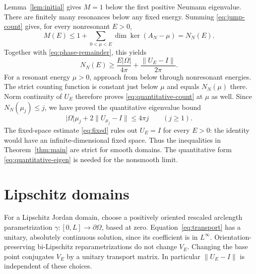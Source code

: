 \documentclass[11pt]{amsart}
\numberwithin{equation}{section}
\newcommand{\norm}[1]{\lVert #1\rVert}
\begin{document}
Lemma~\ref{lem:initial} gives $M=1$ below the first positive Neumann
eigenvalue. There are finitely many resonances below any fixed energy.
Summing \eqref{eq:jump-count} gives, for every nonresonant $E>0$,
\[
 M(E)\le 1+\sum_{0<\mu<E}\dim\ker(A_N-\mu)=N_N(E).
\]
Together with \eqref{eq:phase-remainder}, this yields
\begin{equation}\label{eq:quantitative-count}
 N_N(E)\ge\frac{E|\Omega|}{4\pi}+\frac{\norm{U_E-I}}{2\pi}.
\end{equation}
For a resonant energy $\mu>0$, approach from below through nonresonant
energies. The strict counting function is constant just below $\mu$
and equals $N_N(\mu)$ there. Norm continuity of $U_E$ therefore proves
\eqref{eq:quantitative-count} at $\mu$ as well.
Since $N_N(\mu_j)\le j$, we have proved the quantitative eigenvalue bound
\begin{equation}\label{eq:quantitative-eigen}
 |\Omega|\mu_j+2\norm{U_{\mu_j}-I}\le4\pi j\qquad(j\ge1).
\end{equation}
The fixed-space estimate \eqref{eq:fixed} rules out $U_E=I$ for every
$E>0$: the identity would have an infinite-dimensional fixed space.
Thus the inequalities in Theorem~\ref{thm:main} are strict for smooth
domains. The quantitative form \eqref{eq:quantitative-eigen} is needed
for the nonsmooth limit.

\section{Lipschitz domains}\label{sec:lipschitz}

For a Lipschitz Jordan domain, choose a positively oriented rescaled
arclength parametrization $\gamma:[0,L]\to\partial\Omega$, based at zero.
Equation~\eqref{eq:transport} has a unitary, absolutely continuous
solution, since its coefficient is in $L^\infty$.
Orientation-preserving bi-Lipschitz reparametrizations do not change
$V_E$. Changing the base point conjugates $V_E$ by a unitary transport
matrix. In particular $\norm{U_E-I}$ is independent of these choices.
\end{document}
